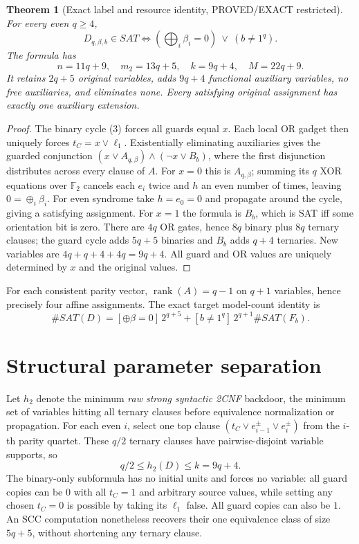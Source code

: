 \documentclass[11pt]{article}
\newtheorem{theorem}{Theorem}
\begin{document}
\begin{theorem}[Exact label and resource identity, PROVED/EXACT restricted]
For every even $q\ge4$,
\[
D_{q,\beta,b}\in SAT
\iff \left(\bigoplus_i\beta_i=0\right)
\ \lor\ (b\ne1^q). \tag{4}
\]
The formula has
\[
n=11q+9,\quad m_2=13q+5,\quad k=9q+4,\quad M=22q+9. \tag{5}
\]
It retains $2q+5$ original variables, adds $9q+4$ functional
auxiliary variables, no free auxiliaries, and eliminates none.
Every satisfying original assignment has exactly one auxiliary extension.
\end{theorem}
\begin{proof}
The binary cycle (3) forces all guards equal $x$.
Each local OR gadget then uniquely forces $t_C=x\vee\ell_1$.
Existentially eliminating auxiliaries gives the guarded conjunction
$(x\vee A_{q,\beta})\land(\neg x\vee B_b)$, where the first
disjunction distributes across every clause of $A$.
For $x=0$ this is $A_{q,\beta}$; summing its $q$ XOR
equations over $\mathbb F_2$ cancels each $e_i$ twice and $h$
an even number of times, leaving $0=\oplus_i\beta_i$.
For even syndrome take $h=e_0=0$ and propagate around the cycle,
giving a satisfying assignment. For $x=1$ the formula is $B_b$,
which is SAT iff some orientation bit is zero.
There are $4q$ OR gates, hence $8q$ binary plus $8q$ ternary
clauses; the guard cycle adds $5q+5$ binaries and $B_b$
adds $q+4$ ternaries. New variables are $4q+q+4+4q=9q+4$.
All guard and OR values are uniquely determined by $x$ and
the original values.
\end{proof}
For each consistent parity vector, $\operatorname{rank}(A)=q-1$ on
$q+1$ variables, hence precisely four affine assignments.
The exact target model-count identity is
\[
\#SAT(D)=[\oplus\beta=0]\,2^{q+5}
+[b\ne1^q]\,2^{q+1}\#SAT(F_b). \tag{6}
\]

\section{Structural parameter separation}
Let $h_2$ denote the minimum \emph{raw strong syntactic 2CNF}
backdoor, the minimum set of variables hitting all ternary clauses
before equivalence normalization or propagation.
For each even $i$, select one top clause
$(t_C\vee e_{i-1}^{\pm}\vee e_i^{\pm})$
from the $i$-th parity quartet.
These $q/2$ ternary clauses have pairwise-disjoint variable supports,
so
\[
\boxed{q/2\le h_2(D)\le k=9q+4.} \tag{7}
\]
The binary-only subformula has no initial units and forces no variable:
all guard copies can be $0$ with all $t_C=1$ and arbitrary source
values, while setting any chosen $t_C=0$ is possible by taking its
$\ell_1$ false. All guard copies can also be $1$.
An SCC computation nonetheless recovers their one equivalence class
of size $5q+5$, without shortening any ternary clause.
\end{document}
